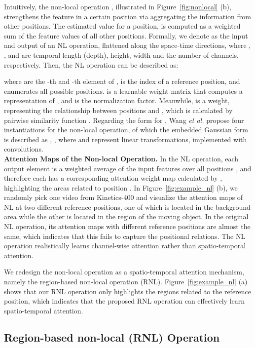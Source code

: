 \documentclass[a4paper,conference]{IEEEtran}
\begin{document}
Intuitively, the non-local operation \cite{wang2018non}, illustrated in Figure~\ref{fig:nonlocal} (b), strengthens the feature in a certain position via aggregating the information from other positions. The estimated value for a position, is computed as a weighted sum of the feature values of all other positions. Formally, we denote  as the input and output of an NL operation, flattened along the space-time directions, where , ,  and  are temporal length (depth), height, width and the number of channels, respectively. Then, the NL operation can be described as:

where  are the -th and -th element of ,  is the index of a reference position, and  enumerates all possible positions.  is a learnable weight matrix that computes a representation of , and  is the normalization factor. Meanwhile,  is a weight, representing the relationship between positions  and , which is calculated by pairwise similarity function . Regarding the form for , Wang {\em et al.} \cite{wang2018non} propose four instantiations for the non-local operation, of which the embedded Gaussian form is described as , , where  and  represent linear transformations, implemented with  convolutions.\\


\noindent \textbf{Attention Maps of the Non-local Operation.} In the NL operation, each output element  is a weighted average of the input features over all positions , and therefore each  has a corresponding attention weight map calculated by , highlighting the areas related to position . In Figure~\ref{fig:example_nl} (b), we randomly pick one video from Kinetics-400 and visualize the attention maps of NL at two different reference positions, one of which is located in the background area while the other is located in the region of the moving object. In the original NL operation, its attention maps with different reference positions are almost the same, which indicates that this fails to capture the positional relations. The NL operation realistically learns channel-wise attention rather than spatio-temporal attention. 

We redesign the non-local operation as a spatio-temporal attention mechanism, namely the region-based non-local operation (RNL). Figure~\ref{fig:example_nl} (a) shows that our RNL operation only highlights the regions related to the reference position, which indicates that the proposed RNL operation can effectively learn spatio-temporal attention.

\subsection{Region-based non-local (RNL) Operation}
\label{region-based non-local operation}
\end{document}
